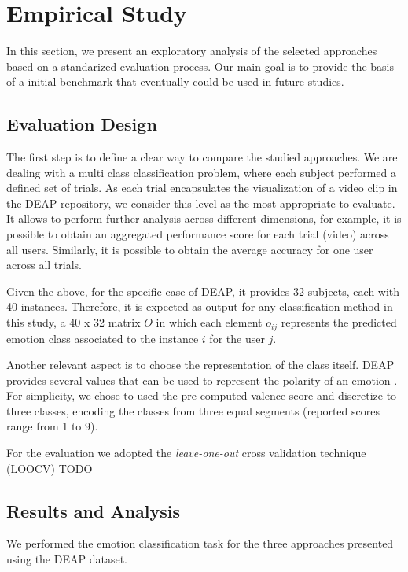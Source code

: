 \documentclass{sig-alternate}
\begin{document}
\section{Empirical Study}
\label{study}

In this section, we present an  exploratory 
analysis of the selected approaches based on a standarized
evaluation process. Our main goal is to provide the basis
of a initial benchmark that eventually could be used in future
studies.

\subsection{ Evaluation Design} 

The first step is to define a clear way to compare the 
studied approaches. We are dealing with a multi class classification
problem, where  each subject performed a defined set of trials. As
each trial encapsulates the visualization of a video clip in the DEAP 
repository, we consider
this level as the most appropriate to evaluate. It allows to perform 
further analysis across different dimensions, for example, it is possible
to obtain an aggregated performance score for each  trial (video) 
across all users. Similarly, it is possible to obtain the average 
accuracy for one 
user across all trials.

Given the above,  for the specific case of DEAP, it provides 32
subjects, 
each with 40 instances. Therefore, it is expected as output for any 
classification method in this study, a  40 x 32 matrix  $O$ in  which 
each element $o_{ij}$ represents the predicted emotion class 
associated to the instance $i$ for the user $j$.
 
Another relevant aspect is to choose the representation of the 
class itself. DEAP provides several  values that can be used to 
represent the polarity of an emotion . For simplicity, we chose to used 
the pre-computed valence score  and discretize to three classes, 
encoding the classes from three equal segments (reported scores
range from 1 to 9). 

For the evaluation we adopted the \emph{leave-one-out} cross 
validation technique (LOOCV)\cite{elisseeff2003leave,kearns1999algorithmic}
TODO
\subsection{ Results and Analysis}

We performed the emotion classification task for the three approaches presented
using the DEAP dataset.
\end{document}
